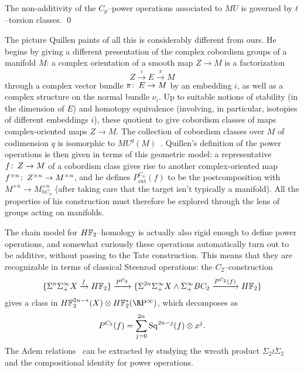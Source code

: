 \begin{corollary}
The non-additivity of the \(C_p\)--power operations associated to \(MU\) is governed by \(t\)--torsion classes. \qed
\end{corollary}

\begin{remark}
The picture Quillen paints of all this is considerably different from ours.  He begins by giving a different presentation of the complex cobordism groups of a manifold \(M\): a complex orientation of a smooth map \(Z \to M\) is a factorization \[Z \xrightarrow{i} E \xrightarrow{\pi} M\] through a complex vector bundle \(\pi\colon\thinspace E \to M\) by an embedding \(i\), as well as a complex structure on the normal bundle \(\nu_i\).  Up to suitable notions of stability (in the dimension of \(E\)) and homotopy equivalence (involving, in particular, isotopies of different embeddings \(i\)), these quotient to give cobordism classes of maps complex-oriented maps \(Z \to M\).  The collection of cobordism classes over \(M\) of codimension \(q\) is isomorphic to \(MU^q(M)\)~\cite[Proposition 1.2]{Quillen}.  Quillen's definition of the power operations is then given in terms of this geometric model: a representative \(f\colon\thinspace Z \to M\) of a cobordism class gives rise to another complex-oriented map \(f^{\times n}\colon\thinspace Z^{\times n} \to M^{\times n}\), and he defines \(P^{C_n}_{\mathrm{ext}}(f)\) to be the postcomposition with \(M^{\times n} \to M^{\times n}_{hC_n}\) (after taking care that the target isn't typically a manifold).  All the properties of his construction must therefore be explored through the lens of groups acting on manifolds.
\end{remark}

\begin{example}
The chain model for \(\HFtwo\)--homology is actually also rigid enough to define power operations, and somewhat curiously these operations automatically turn out to be additive, without passing to the Tate construction.  This means that they are recognizable in terms of classical Steenrod operations: the \(C_2\)--construction \[\{\Susp^n \Susp^\infty_+ X \xrightarrow{f} \HFtwo\} \xrightarrow{P^{C_2}} \{\Susp^{2n} \Susp^\infty_+ X \sm \Susp^\infty_+ BC_2 \xrightarrow{P^{C_2}(f)} \HFtwo\}\] gives a class in \(\HFtwo^{2n-*}(X) \otimes \HFtwo^*(\RP^\infty)\), which decomposes as \[P^{C_2}(f) = \sum_{j=0}^{2n} \operatorname{Sq}^{2n-j}(f) \otimes x^j.\]  The Adem relations~\cite{Adem} can be extracted by studying the wreath product \(\Sigma_2 \wr \Sigma_2\) and the compositional identity for power operations.
\end{example}

